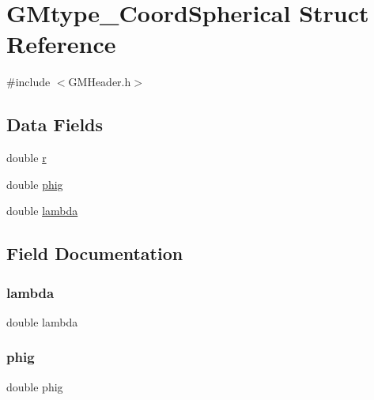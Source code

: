 \hypertarget{struct_g_mtype___coord_spherical}{}\section{G\+Mtype\+\_\+\+Coord\+Spherical Struct Reference}
\label{struct_g_mtype___coord_spherical}


{\ttfamily \#include $<$G\+M\+Header.\+h$>$}

\subsection*{Data Fields}
\begin{DoxyCompactItemize}
\item 
double \mbox{\hyperlink{struct_g_mtype___coord_spherical_a880a49112fedae68e714341a9a082fb6}{r}}
\item 
double \mbox{\hyperlink{struct_g_mtype___coord_spherical_a1861a6281e1d9537931ca28d49d91d0f}{phig}}
\item 
double \mbox{\hyperlink{struct_g_mtype___coord_spherical_a3db359547eed8cfd48ca821d95f577af}{lambda}}
\end{DoxyCompactItemize}


\subsection{Field Documentation}
\mbox{\label{struct_g_mtype___coord_spherical_a3db359547eed8cfd48ca821d95f577af}} 
\subsubsection{\texorpdfstring{lambda}{lambda}}
{\footnotesize\ttfamily double lambda}

\mbox{\label{struct_g_mtype___coord_spherical_a1861a6281e1d9537931ca28d49d91d0f}} 
\subsubsection{\texorpdfstring{phig}{phig}}
{\footnotesize\ttfamily double phig}

